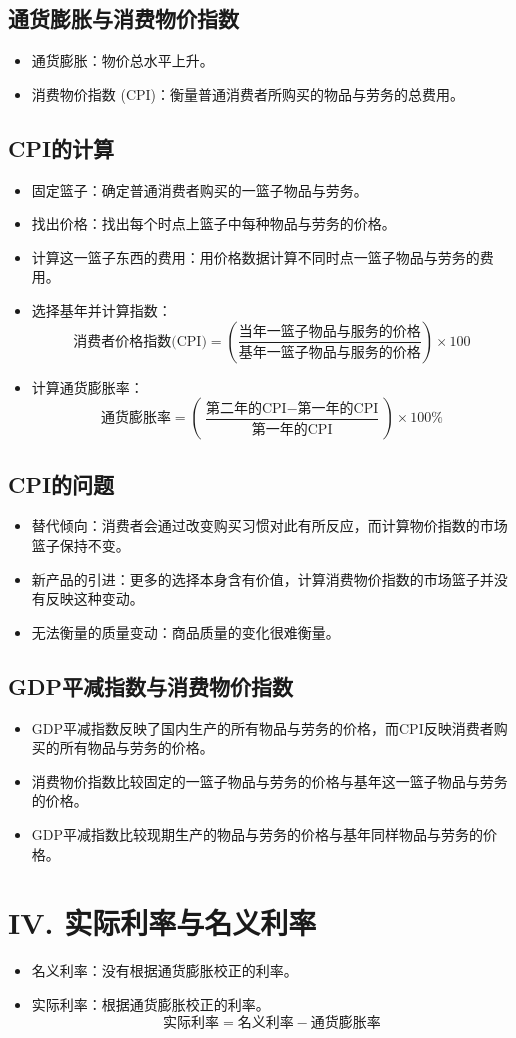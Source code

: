 \documentclass[12pt, a4paper]{article}
\begin{document}
\subsection*{通货膨胀与消费物价指数}
\begin{itemize}
    \item 通货膨胀：物价总水平上升。
    \item 消费物价指数 (CPI)：衡量普通消费者所购买的物品与劳务的总费用。
\end{itemize}

\subsection*{CPI的计算}
\begin{itemize}
    \item 固定篮子：确定普通消费者购买的一篮子物品与劳务。
    \item 找出价格：找出每个时点上篮子中每种物品与劳务的价格。
    \item 计算这一篮子东西的费用：用价格数据计算不同时点一篮子物品与劳务的费用。
    \item 选择基年并计算指数：
    \[ \text{消费者价格指数(CPI)} = \left( \frac{\text{当年一篮子物品与服务的价格}}{\text{基年一篮子物品与服务的价格}} \right) \times 100 \]
    \item 计算通货膨胀率：
    \[ \text{通货膨胀率} = \left( \frac{\text{第二年的CPI} - \text{第一年的CPI}}{\text{第一年的CPI}} \right) \times 100\% \]
\end{itemize}

\subsection*{CPI的问题}
\begin{itemize}
    \item 替代倾向：消费者会通过改变购买习惯对此有所反应，而计算物价指数的市场篮子保持不变。
    \item 新产品的引进：更多的选择本身含有价值，计算消费物价指数的市场篮子并没有反映这种变动。
    \item 无法衡量的质量变动：商品质量的变化很难衡量。
\end{itemize}

\subsection*{GDP平减指数与消费物价指数}
\begin{itemize}
    \item GDP平减指数反映了国内生产的所有物品与劳务的价格，而CPI反映消费者购买的所有物品与劳务的价格。
    \item 消费物价指数比较固定的一篮子物品与劳务的价格与基年这一篮子物品与劳务的价格。
    \item GDP平减指数比较现期生产的物品与劳务的价格与基年同样物品与劳务的价格。
\end{itemize}

\section*{IV. 实际利率与名义利率}
\begin{itemize}
    \item 名义利率：没有根据通货膨胀校正的利率。
    \item 实际利率：根据通货膨胀校正的利率。
    \[ \text{实际利率} = \text{名义利率} - \text{通货膨胀率} \]
\end{itemize}
\end{document}
